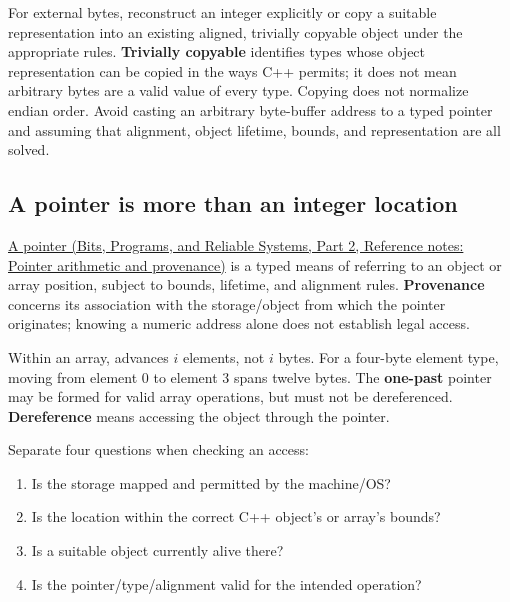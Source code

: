 For external bytes, reconstruct an integer explicitly or copy a suitable representation into an existing aligned, trivially copyable object under the appropriate rules. \textbf{Trivially copyable} identifies types whose object representation can be copied in the ways C++ permits; it does not mean arbitrary bytes are a valid value of every type. Copying does not normalize endian order. Avoid casting an arbitrary byte-buffer address to a typed pointer and assuming that alignment, object lifetime, bounds, and representation are all solved.

\subsection{A pointer is more than an integer location}\label{05-engine-i-ch002-a-pointer-is-more-than-an-integer-location}

\hypertarget{05-engine-i-ch002-a-pointer-is-more-than-an-integer-location}{}

\href{../01-Bits-Programs-and-Reliable-Systems-P02/main.pdf\#nameddest=appendix-6af5921bc853}{A pointer (Bits, Programs, and Reliable Systems, Part 2, Reference notes: Pointer arithmetic and provenance)} is a typed means of referring to an object or array position, subject to bounds, lifetime, and alignment rules. \textbf{Provenance} concerns its association with the storage/object from which the pointer originates; knowing a numeric address alone does not establish legal access.

Within an array,  advances \(i\) elements, not \(i\) bytes. For a four-byte element type, moving from element 0 to element 3 spans twelve bytes. The \textbf{one-past} pointer may be formed for valid array operations, but must not be dereferenced. \textbf{Dereference} means accessing the object through the pointer.

Separate four questions when checking an access:

\begin{enumerate}
\def\labelenumi{\arabic{enumi}.}
\tightlist
\item
  Is the storage mapped and permitted by the machine/OS?
\item
  Is the location within the correct C++ object's or array's bounds?
\item
  Is a suitable object currently alive there?
\item
  Is the pointer/type/alignment valid for the intended operation?
\end{enumerate}

